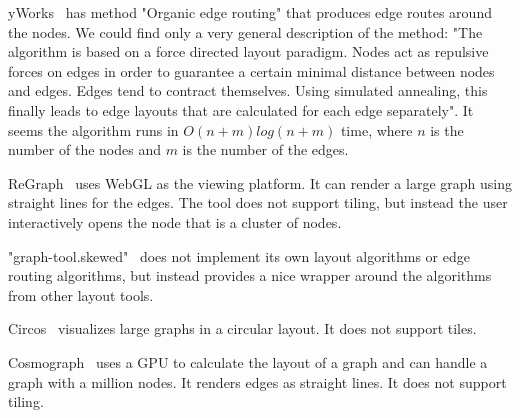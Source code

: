 \documentclass{gd-llncs}
\begin{document}
yWorks~\cite{yworks} has method "Organic edge routing" that produces edge
routes around the nodes. We could find only
a very general description of the method: "The algorithm is based on a force
directed layout paradigm. Nodes act as repulsive forces on edges in order to
guarantee a certain minimal distance between nodes and edges. Edges tend to contract
themselves. Using simulated annealing, this finally leads to edge layouts that
are calculated for each edge separately". It seems the algorithm runs in $O(n+m)log(n+m)$
time, where $n$ is the number of the nodes and $m$ is the number of the edges.

ReGraph~\cite{regraph} uses WebGL as the viewing platform. It can render a large
graph using straight lines for the edges. The tool does not support tiling, but instead
the user interactively opens the node that is a cluster of nodes. 

"graph-tool.skewed"~\cite{skewed} does not implement its own layout algorithms or
edge routing algorithms, but instead provides a nice wrapper around the algorithms from
other layout tools.

Circos~\cite{circos} visualizes large graphs in a circular layout. It does not support tiles.


Cosmograph~\cite{cosmograph} uses a GPU to calculate the layout of a graph and can 
handle a graph with a million nodes. It renders edges as straight lines. 
It does not support tiling.
\end{document}
